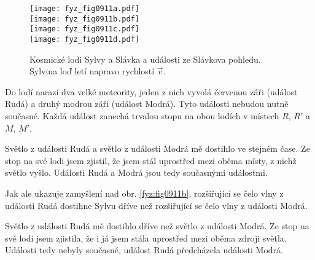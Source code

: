       \begin{figure}[ht!]  %
        \centering
          {\texttt{[image: fyz\_fig0911a.pdf]}}                                 \\    
          {\texttt{[image: fyz\_fig0911b.pdf]}}                                 \\   
          {\texttt{[image: fyz\_fig0911c.pdf]}} \\
          {\texttt{[image: fyz\_fig0911d.pdf]}}
        \caption{Kosmické lodi Sylvy a Slávka a události ze Slávkova pohledu. Sylvina loď letí 
          napravo rychlostí \(\vec{v}\). \hfill\cite[s.~1010]{Halliday2001}
        }
        \label{fyz:fig0911}
      \end{figure}
      
      Do lodí narazí dva velké meteority, jeden z nich vyvolá červenou záři (událost Rudá) a druhý
      modrou záři (událost Modrá). Tyto události nebudou nutně současné. Každá událost zanechá
      trvalou stopu na obou lodích v místech \(R\), \(R′\) a \(M\), \(M′\).

      \begin{description}[leftmargin=2em,labelindent=1em, style=nextline]
       \item [SLÁVEK řekne:] Světlo z události Rudá a světlo z události Modrá mě dostihlo ve stejném
             čase. Ze stop na své lodi jsem zjistil, že jsem stál uprostřed mezi oběma místy, z
             nichž světlo vyšlo. Události Rudá a Modrá jsou tedy současnými událostmi. 
      \end{description}
      
      Jak ale ukazuje zamyšlení nad obr. \ref{fyz:fig0911b}, rozšiřující se čelo vlny z události Rudá
      dostihne Sylvu dříve než rozšiřující se čelo vlny z události Modrá. 
      
      \begin{description}[leftmargin=2em,labelindent=1em, style=nextline]
        \item [SYLVA řekne:] Světlo z události Rudá mě dostihlo dříve než světlo z události Modrá.
              Ze stop na své lodi jsem zjistila, že i já jsem stála uprostřed mezi oběma zdroji
              světla. Události tedy nebyly současné, událost Rudá předcházela události Modrá. 
      \end{description}
        
